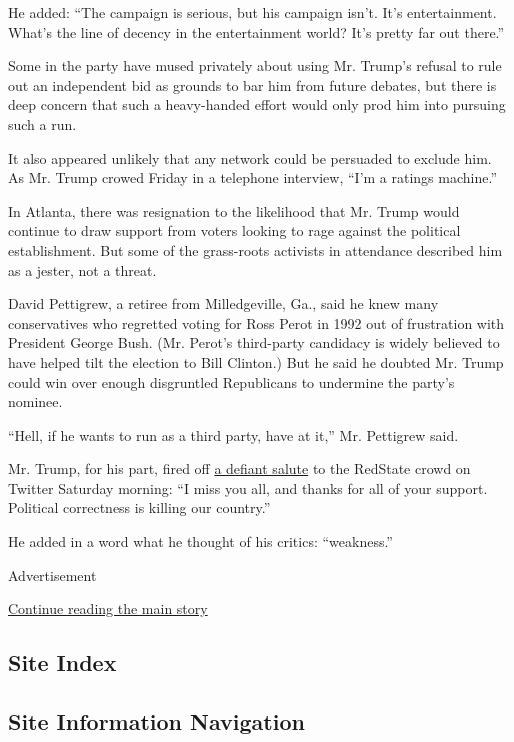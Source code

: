 He added: ``The campaign is serious, but his campaign isn't. It's
entertainment. What's the line of decency in the entertainment world?
It's pretty far out there.''

Some in the party have mused privately about using Mr. Trump's refusal
to rule out an independent bid as grounds to bar him from future
debates, but there is deep concern that such a heavy-handed effort would
only prod him into pursuing such a run.

It also appeared unlikely that any network could be persuaded to exclude
him. As Mr. Trump crowed Friday in a telephone interview, ``I'm a
ratings machine.''

In Atlanta, there was resignation to the likelihood that Mr. Trump would
continue to draw support from voters looking to rage against the
political establishment. But some of the grass-roots activists in
attendance described him as a jester, not a threat.

David Pettigrew, a retiree from Milledgeville, Ga., said he knew many
conservatives who regretted voting for Ross Perot in 1992 out of
frustration with President George Bush. (Mr. Perot's third-party
candidacy is widely believed to have helped tilt the election to Bill
Clinton.) But he said he doubted Mr. Trump could win over enough
disgruntled Republicans to undermine the party's nominee.

``Hell, if he wants to run as a third party, have at it,'' Mr. Pettigrew
said.

Mr. Trump, for his part, fired off
\href{https://twitter.com/realDonaldTrump/status/630007166129303552}{a
defiant salute} to the RedState crowd on Twitter Saturday morning: ``I
miss you all, and thanks for all of your support. Political correctness
is killing our country.''

He added in a word what he thought of his critics: ``weakness.''

Advertisement

\protect\hyperlink{after-bottom}{Continue reading the main story}

\hypertarget{site-index}{%
\subsection{Site Index}\label{site-index}}

\hypertarget{site-information-navigation}{%
\subsection{Site Information
Navigation}\label{site-information-navigation}}


